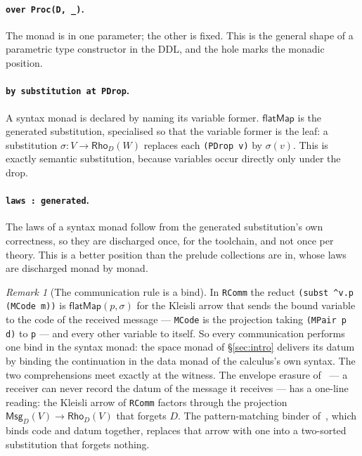 \documentclass[11pt]{article}
\theoremstyle{definition}
\theoremstyle{plain}
\theoremstyle{remark}
\newtheorem{remark}[definition]{Remark}
\newcommand{\bind}{\mathsf{flatMap}}
\begin{document}
\paragraph{\texttt{over Proc(D, \_)}.} The monad is in one parameter; the other
is fixed. This is the general shape of a parametric type constructor in the
DDL, and the hole marks the monadic position.

\paragraph{\texttt{by substitution at PDrop}.} A syntax monad is declared by
naming its variable former. \(\bind\) is the generated substitution, specialised
so that the variable former is the leaf: a substitution
\(\sigma : V\to\mathsf{Rho}_D(W)\) replaces each \texttt{(PDrop v)} by
\(\sigma(v)\). This is exactly semantic substitution, because variables occur
directly only under the drop.

\paragraph{\texttt{laws : generated}.} The laws of a syntax monad follow from
the generated substitution's own correctness, so they are discharged once, for
the toolchain, and not once per theory. This is a better position than the
prelude collections are in, whose laws are discharged monad by monad.

\begin{remark}[The communication rule is a bind]
\label{rem:commbind}
In \texttt{RComm} the reduct \texttt{(subst \^{}v.p (MCode m))} is
\(\bind(p, \sigma)\) for the Kleisli arrow that sends the bound variable to the
code of the received message --- \texttt{MCode} is the projection taking
\texttt{(MPair p d)} to \texttt{p} --- and every other variable to itself. So every
communication performs one bind in the syntax monad: the space monad of
\S\ref{sec:intro} delivers its datum by binding the continuation in the data
monad of the calculus's own syntax. The two comprehensions meet exactly at the
witness. The envelope erasure of~\cite{WSH} --- a receiver can never record the
datum of the message it receives --- has a one-line reading: the Kleisli arrow
of \texttt{RComm} factors through the projection
\(\mathsf{Msg}_D(V)\to\mathsf{Rho}_D(V)\) that forgets \(D\). The
pattern-matching binder of~\cite{Oriented}, which binds code and datum
together, replaces that arrow with one into a two-sorted substitution that
forgets nothing.
\end{remark}
\end{document}
